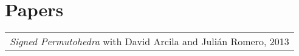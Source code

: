 \section{\sc Papers}
\begin{tabular}{@{}p{5in}}
    {\em Signed Permutohedra} with David Arcila and Juli\'an Romero, 2013
\end{tabular}


